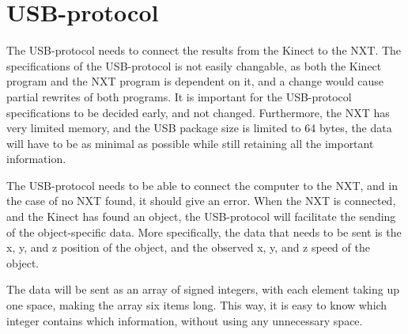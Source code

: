 \section{USB-protocol}
The USB-protocol needs to connect the results from the Kinect to the NXT. The specifications of the USB-protocol is not easily changable, as both the Kinect program and the NXT program is dependent on it, and a change would cause partial rewrites of both programs. It is important for the USB-protocol specifications to be decided early, and not changed.
Furthermore, the NXT has very limited memory, and the USB package size is limited to 64 bytes, the data will have to be as minimal as possible while still retaining all the important information. 

The USB-protocol needs to be able to connect the computer to the NXT, and in the case of no NXT found, it should give an error.
When the NXT is connected, and the Kinect has found an object, the USB-protocol will facilitate the sending of the object-specific data.
More specifically, the data that needs to be sent is the x, y, and z position of the object, and the observed x, y, and z speed of the object.

The data will be sent as an array of signed integers, with each element taking up one space, making the array six items long. This way, it is easy to know which integer contains which information, without using any unnecessary space.